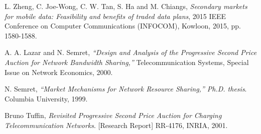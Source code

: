 \documentclass[12pt]{article}
\theoremstyle{definition}
\begin{document}
\begin{thebibliography}{9}

L. Zheng, C. Joe-Wong, C. W. Tan, S. Ha and M. Chiangs, 
\textit{Secondary markets for mobile data: Feasibility and benefits of traded
data plans}, 2015 IEEE
Conference on Computer Communications (INFOCOM), Kowloon, 2015, pp. 1580-1588.

A. A. Lazar and N. Semret, 
\textit{“Design and Analysis of the Progressive Second Price Auction for Network
Bandwidth Sharing,”} Telecommunication Systems, Special Issue on Network Economics, 2000.

N. Semret, 
\textit{“Market Mechanisms for Network Resource Sharing,”
Ph.D. thesis}. 
Columbia University, 1999.

Bruno Tuffin,
\textit{Revisited Progressive Second Price Auction for Charging
Telecommunication Networks}.
[Research Report] RR-4176, INRIA, 2001.
 
\end{thebibliography}
\end{document}

